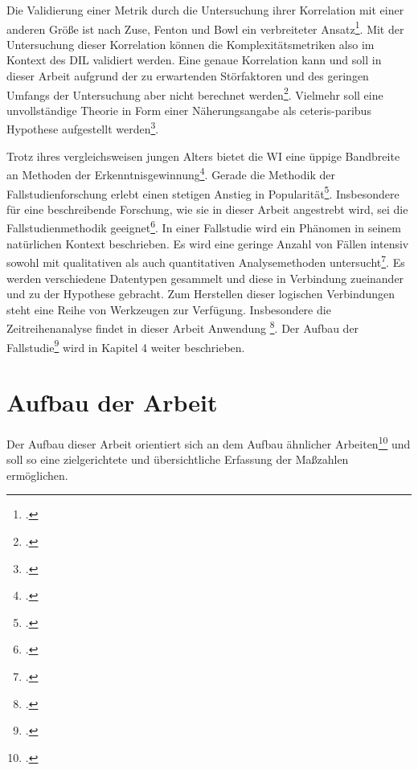 Die Validierung einer Metrik durch die Untersuchung ihrer Korrelation
mit einer anderen Größe ist nach Zuse, Fenton und Bowl ein verbreiteter
Ansatz\footcite[Vgl. ][S. 561f]{zuseSoftwareComplexityMeasures1991}. Mit der Untersuchung dieser
Korrelation können die Komplexitätsmetriken also im Kontext des DIL
validiert werden. Eine genaue Korrelation kann und soll in dieser Arbeit
aufgrund der zu erwartenden Störfaktoren und des geringen Umfangs der
Untersuchung aber nicht berechnet werden\footcite[Vgl. ][S. 449]{jonesAppliedSoftwareMeasurement2008}.
Vielmehr soll eine unvollständige Theorie in Form einer Näherungsangabe
als ceteris-paribus Hypothese aufgestellt werden\footcite[Vgl. ][S. 3]{wildeMethodenspektrumWirtschaftsinformatikUberblick2006}.

Trotz ihres vergleichsweisen jungen Alters bietet die WI eine üppige
Bandbreite an Methoden der Erkenntnisgewinnung\footcite[Vgl. ][S. 113]{heinrichForschungsmethodikIntegrationsdisziplinBeitrag2005}. Gerade die Methodik der Fallstudienforschung erlebt einen
stetigen Anstieg in Popularität\footcite[Vgl. ][S. 22]{yinCaseStudyResearch2014}. Insbesondere für eine beschreibende
Forschung, wie sie in dieser Arbeit angestrebt wird, sei die
Fallstudienmethodik geeignet\footcite[Vgl. ][S. 607]{dubeRigorInformationSystems2003}. In einer Fallstudie wird ein Phänomen in seinem natürlichen
Kontext beschrieben. Es wird eine geringe Anzahl von Fällen intensiv
sowohl mit qualitativen als auch quantitativen Analysemethoden
untersucht\footcite[Vgl. ][S. 7]{gothlichFallstudienAlsForschungsmethode2003}.
Es werden verschiedene Datentypen gesammelt und diese in Verbindung
zueinander und zu der Hypothese gebracht. Zum Herstellen dieser
logischen Verbindungen steht eine Reihe von Werkzeugen zur Verfügung.
Insbesondere die Zeitreihenanalyse findet in dieser Arbeit Anwendung
\footcite[Vgl. ][S. 6]{gothlichFallstudienAlsForschungsmethode2003}. Der Aufbau
der Fallstudie\footcite[Vgl. ][S.
8ff]{gothlichFallstudienAlsForschungsmethode2003} wird in Kapitel 4 weiter beschrieben.

\section{Aufbau der Arbeit}\label{aufbau-der-arbeit}

Der Aufbau dieser Arbeit orientiert sich an dem Aufbau ähnlicher
Arbeiten\footcite[Vgl. ][S. 260]{aleneziEmpiricalAnalysisComplexity2015} und soll so eine zielgerichtete und
übersichtliche Erfassung der Maßzahlen ermöglichen.

